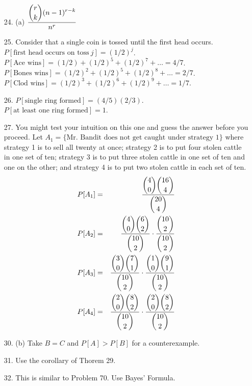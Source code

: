 \begin{enumerate}
	\item[24.] (a) $\dfrac{\displaystyle {r\choose k}(n-1)^{r-k}}{n^r}$

	\item[25.] Consider that a single coin is tossed until the first head occurs. \\
				$P[\text{first head occurs on toss}\ j] = (1/2)^j$. \\
				$P[\text{Ace wins}] = (1/2) + (1/2)^5 + (1/2)^7 + \ldots = 4/7$. \\
				$P[\text{Bones wins}] = (1/2)^2 + (1/2)^5 + (1/2)^8 + \ldots = 2/7$. \\
				$P[\text{Clod wins}] = (1/2)^3 + (1/2)^6 + (1/2)^9 + \ldots = 1/7$. 
		
	\item[26.] $P[\text{single ring formed}] = (4/5)(2/3)$. \\
				$P[\text{at least one ring formed}] = 1$. 
				
	\item[27.] You might test your intuition on this one and guess the answer before you proceed.  Let $A_1 = \{\text{Mr.\ Bandit does not get caught under strategy 1}\}$ where strategy 1 is to sell all twenty at once; strategy 2 is to put four stolen cattle in one set of ten; strategy 3 is to put three stolen cattle in one set of ten and one on the other; and strategy 4 is to put two stolen cattle in each set of ten.
	\begin{eqnarray*}
		P[A_1] &=& \dfrac{\displaystyle {4\choose 0}{16\choose 4}}{\displaystyle {20\choose 4}} \\
		P[A_2] &=& \dfrac{\displaystyle {4\choose 0}{6\choose 2}}{\displaystyle {10\choose 2}} \cdot \dfrac{\displaystyle {10\choose 2}}{\displaystyle {10\choose 2}} \\
		P[A_3] &=& \dfrac{\displaystyle {3\choose 0}{7\choose 1}}{\displaystyle {10\choose 2}} \cdot \dfrac{\displaystyle {1\choose 0}{9\choose 1}}{\displaystyle {10\choose 2}} \\
		P[A_4] &=& \dfrac{\displaystyle {2\choose 0}{8\choose 2}}{\displaystyle {10\choose 2}} \cdot \dfrac{\displaystyle {2\choose 0}{8\choose 2}}{\displaystyle {10\choose 2}}				
	\end{eqnarray*}

	\newpage
	
	\item[30.] (b) Take $B=C$ and $P[A]>P[B]$ for a counterexample.
	
	\item[31.] Use the corollary of Thorem 29.
	
	\item[32.] This is similar to Problem 70.  Use Bayes' Formula.
	

\end{enumerate}
